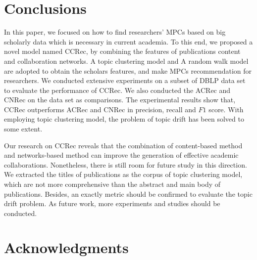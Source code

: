 \documentclass{acm_proc_article-sp}
\begin{document}
\section{Conclusions}
In this paper, we focused on how to find researchers' MPCs based on big scholarly data which is necessary in current academia. To this end, we proposed a novel model named CCRec, by combining the features of publications content and collaboration networks. A topic clustering model and A random walk model are adopted to obtain the scholars features, and make MPCs recommendation for researchers. We conducted extensive experiments on a subset of DBLP data set to evaluate the performance of CCRec. We also conducted the ACRec and CNRec on the data set as comparisons. The experimental results show that, CCRec outperforms ACRec and CNRec in precision, recall and $F1$ score. With employing topic clustering model, the problem of topic drift has been solved to some extent.

Our research on CCRec reveals that the combination of content-based method and networks-based method can improve the generation of effective academic collaborations. Nonetheless, there is still room for future study in this direction. We extracted the titles of publications as the corpus of topic clustering model, which are not more comprehensive than the abstract and main body of publications. Besides, an exactly metric should be confirmed to evaluate the topic drift problem. As future work, more experiments and studies should be conducted.

\section{Acknowledgments}



\balancecolumns
\end{document}
